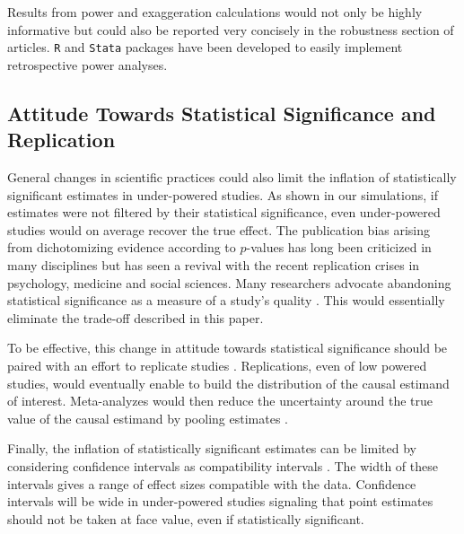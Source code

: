 \documentclass[12pt]{article}
\begin{document}
    Results from power and exaggeration calculations would not only be highly informative but could also be reported very concisely in the robustness section of articles. \texttt{R} and \texttt{Stata} packages have been developed \citep{timm_retrodesign_2019, linden_retrodesign_2019} to easily implement retrospective power analyses. 

\subsection{Attitude Towards Statistical Significance and Replication}

    General changes in scientific practices could also limit the inflation of statistically significant estimates in under-powered studies. As shown in our simulations, if estimates were not filtered by their statistical significance, even under-powered studies would on average recover the true effect. The publication bias arising from dichotomizing evidence according to $p$-values has long been criticized in many disciplines but has seen a revival with the recent replication crises in psychology, medicine and social sciences. Many researchers advocate abandoning statistical significance as a measure of a study's quality \citep{mcshane_abandon_2019}. This would essentially eliminate the trade-off described in this paper.

    To be effective, this change in attitude towards statistical significance should be paired with an effort to replicate studies \citep{christensen_transparency_2018}. Replications, even of low powered studies, would eventually enable to build the distribution of the causal estimand of interest. Meta-analyzes would then reduce the uncertainty around the true value of the causal estimand by pooling estimates \citep{hernan_causal_2021}. 

    Finally, the inflation of statistically significant estimates can be limited by considering confidence intervals as compatibility intervals \citep{shadish_experimental_2002, amrhein_inferential_2019, romer_praise_2020}. The width of these intervals gives a range of effect sizes compatible with the data. Confidence intervals will be wide in under-powered studies signaling that point estimates should not be taken at face value, even if statistically significant.


\end{document}
